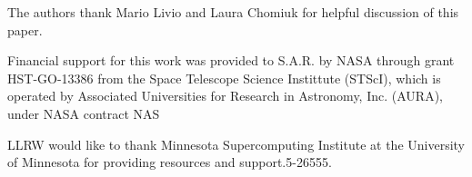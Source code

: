 
\begin{acknowledgments}
The authors thank Mario Livio and Laura Chomiuk for helpful discussion
of this paper.

Financial support for this work was provided to S.A.R. by NASA through
grant HST-GO-13386 from the Space Telescope Science Instittute
(STScI), which is operated by Associated Universities for Research in
Astronomy, Inc. (AURA), under NASA contract NAS

LLRW would like to thank Minnesota Supercomputing Institute at the
University of Minnesota for providing resources and support.5-26555.


\end{acknowledgments}
